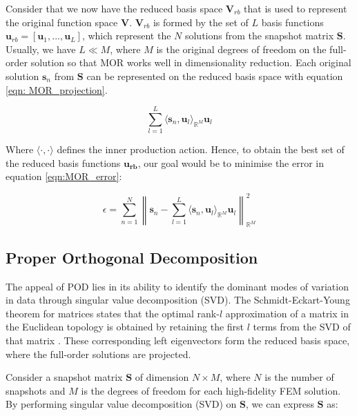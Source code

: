 Consider that we now have the reduced basis space $\mathbf{V}_{rb}$ that is used to represent the original function space $\mathbf{V}$. $\mathbf{V}_{rb}$ is formed by the set of $L$ basis functions $\mathbf{u}_{rb} = [\mathbf{u}_1,...,\mathbf{u}_L]$, which represent the $N$ solutions from the snapshot matrix $\mathbf{S}$. Usually, we have $L \ll M$, where $M$ is the original degrees of freedom on the full-order solution so that MOR works well in dimensionality reduction. Each original solution $\mathbf{s}_n$ from $\mathbf{S}$ can be represented on the reduced basis space with equation \ref{eqn: MOR_projection}. 

\begin{equation}
    \sum_{l=1}^{L} \langle \mathbf{s}_n, \mathbf{u}_l \rangle_{\mathbb{R}^M} \mathbf{u}_l
    \label{eqn: MOR_projection}
\end{equation}

Where $\langle \cdot, \cdot \rangle$ defines the inner production action. Hence, to obtain the best set of the reduced basis functions $\mathbf{u_{rb}}$, our goal would be to minimise the error in equation \ref{eqn:MOR_error}:

\begin{equation}
   \epsilon = \sum_{n=1}^{N} \left\|\mathbf{s}_n -  \sum_{l=1}^{L} \langle \mathbf{s}_n, \mathbf{u}_l \rangle_{\mathbb{R}^M} \mathbf{u}_l \right\|_{\mathbb{R}^M} ^2
   \label{eqn:MOR_error}
\end{equation}

\subsection{Proper Orthogonal Decomposition}

The appeal of POD lies in its ability to identify the dominant modes of variation in data through singular value decomposition (SVD). The Schmidt-Eckart-Young theorem for matrices states that the optimal rank-$l$ approximation of a matrix in the Euclidean topology is obtained by retaining the first $l$ terms from the SVD of that matrix \cite{vannieuwenhoven_nicaise_vandebril_meerbergen_2014, Eckart1936TheAO}. These corresponding left eigenvectors form the reduced basis space, where the full-order solutions are projected.  

Consider a snapshot matrix $\mathbf{S}$ of dimension $N \times M$, where $N$ is the number of snapshots and $M$ is the degrees of freedom for each high-fidelity FEM solution. By performing singular value decomposition (SVD) on $\mathbf{S}$, we can express $\mathbf{S}$ as:

